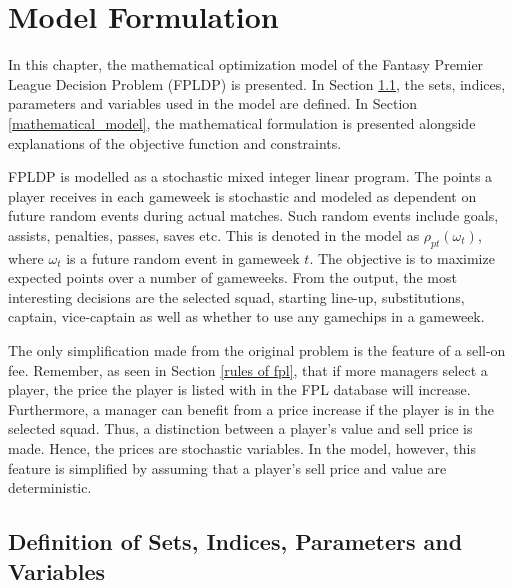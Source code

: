 
\chapter{Model Formulation} \label{chapter_model_formulation}

In this chapter, the mathematical optimization model of the Fantasy Premier League Decision Problem (FPLDP) is presented. In Section \ref{def_sets_ind_par_var}, the sets, indices, parameters and variables used in the model are defined. In Section \ref{mathematical_model}, the mathematical formulation is presented alongside explanations of the objective function and constraints.


\newpar

FPLDP is modelled as a stochastic mixed integer linear program. The points a player receives in each gameweek is stochastic and modeled as dependent on future random events during actual matches. Such random events include goals, assists, penalties, passes, saves etc. This is denoted in the model as $\rho_{pt}(\omega_{t})$, where $\omega_{t}$ is a future random event in gameweek $t$. The objective is to maximize expected points over a number of gameweeks. From the output, the most interesting decisions are the selected squad, starting line-up, substitutions, captain, vice-captain as well as whether to use any gamechips in a gameweek. 

\newpar

The only simplification made from the original problem is the feature of a sell-on fee. Remember, as seen in Section \ref{rules of fpl}, that if more managers select a player, the price the player is listed with in the FPL database will increase. Furthermore, a manager can benefit from a price increase if the player is in the selected squad. Thus, a distinction between a player's value and sell price is made. Hence, the prices are stochastic variables. In the model, however, this feature is simplified by assuming that a player's sell price and value are deterministic.







\newpage

\section{Definition of Sets, Indices, Parameters and Variables}\label{def_sets_ind_par_var}

